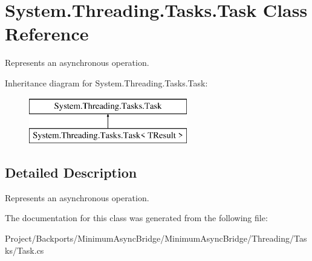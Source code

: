 \hypertarget{class_system_1_1_threading_1_1_tasks_1_1_task}{}\section{System.\+Threading.\+Tasks.\+Task Class Reference}
\label{class_system_1_1_threading_1_1_tasks_1_1_task}


Represents an asynchronous operation.  


Inheritance diagram for System.\+Threading.\+Tasks.\+Task\+:\begin{figure}[H]
\begin{center}
\leavevmode
\includegraphics[height=2.000000cm]{class_system_1_1_threading_1_1_tasks_1_1_task}
\end{center}
\end{figure}


\subsection{Detailed Description}
Represents an asynchronous operation. 



The documentation for this class was generated from the following file\+:\begin{DoxyCompactItemize}
\item 
Project/\+Backports/\+Minimum\+Async\+Bridge/\+Minimum\+Async\+Bridge/\+Threading/\+Tasks/Task.\+cs\end{DoxyCompactItemize}
